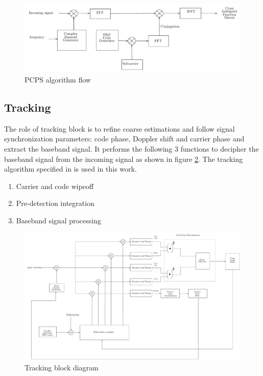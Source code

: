 \documentclass[conference]{IEEEtran}
\begin{document}
\begin{normalsize}
\begin{figure}[ht]
	\centering
	\includegraphics[width=1\columnwidth]{figs/pcps}
	\centering
	\caption{PCPS algorithm flow}
	\label{fig:pcps_flow}
\end{figure}
\end{normalsize}

\subsection{Tracking}
The role of tracking block \cite{b5} is to refine coarse estimations and follow signal synchronization parameters: code phase, Doppler shift 
and carrier phase and extract the baseband signal. It performs the following 3 functions to decipher 
the baseband signal from the incoming signal as shown in figure \ref{fig:tracking}. The tracking algorithm 
specified in \cite{b1} is used in this work.
\begin{enumerate}
	\item Carrier and code wipeoff 
	\item Pre-detection integration
	\item Baseband signal processing
\end{enumerate}

\begin{normalsize}
\begin{figure}[ht]
\centering
\includegraphics[width=1\columnwidth]{figs/tracking}
\centering
\caption{Tracking block diagram}
\label{fig:tracking}
\end{figure}
\end{normalsize}
\end{document}
